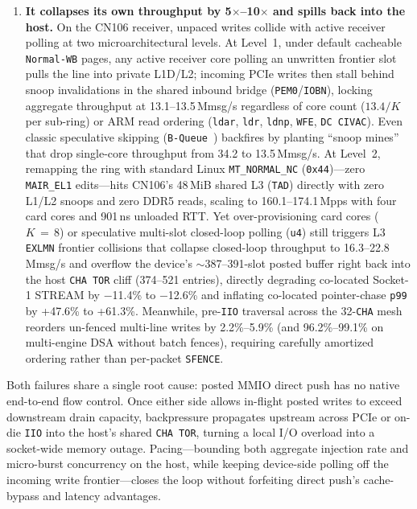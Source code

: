 \begin{enumerate}
  \item \textbf{It collapses its own throughput by 5$\times$--10$\times$ and spills back into the host.} On the CN106 receiver, unpaced writes collide with active receiver polling at two microarchitectural levels. At Level~1, under default cacheable \texttt{Normal-WB} pages, any active receiver core polling an unwritten frontier slot pulls the line into private L1D/L2; incoming PCIe writes then stall behind snoop invalidations in the shared inbound bridge (\texttt{PEM0}/\texttt{IOBN}), locking aggregate throughput at 13.1--13.5\,Mmsg/s regardless of core count ($13.4/K$ per sub-ring) or ARM read ordering (\texttt{ldar}, \texttt{ldr}, \texttt{ldnp}, \texttt{WFE}, \texttt{DC CIVAC}). Even classic speculative skipping (\texttt{B-Queue}~\cite{wang2013bqueue}) backfires by planting ``snoop mines'' that drop single-core throughput from 34.2 to 13.5\,Mmsg/s. At Level~2, remapping the ring with standard Linux \texttt{MT\_NORMAL\_NC} (\texttt{0x44})---zero \texttt{MAIR\_EL1} edits---hits CN106's 48\,MiB shared L3 (\texttt{TAD}) directly with zero L1/L2 snoops and zero DDR5 reads, scaling to 160.1--174.1\,Mpps with four card cores and 901\,ns unloaded RTT. Yet over-provisioning card cores ($K\,=\,8$) or speculative multi-slot closed-loop polling (\texttt{u4}) still triggers L3 \texttt{EXLMN} frontier collisions that collapse closed-loop throughput to 16.3--22.8\,Mmsg/s and overflow the device's $\sim$387--391-slot posted buffer right back into the host \texttt{CHA TOR} cliff (374--521 entries), directly degrading co-located Socket-1 STREAM by $-$11.4\% to $-$12.6\% and inflating co-located pointer-chase \texttt{p99} by +47.6\% to +61.3\%. Meanwhile, pre-\texttt{IIO} traversal across the 32-\texttt{CHA} mesh reorders un-fenced multi-line writes by 2.2\%--5.9\% (and 96.2\%--99.1\% on multi-engine DSA without batch fences), requiring carefully amortized ordering rather than per-packet \texttt{SFENCE}.
\end{enumerate}

Both failures share a single root cause: posted MMIO direct push has no native end-to-end flow control. Once either side allows in-flight posted writes to exceed downstream drain capacity, backpressure propagates upstream across PCIe or on-die \texttt{IIO} into the host's shared \texttt{CHA TOR}, turning a local I/O overload into a socket-wide memory outage. Pacing---bounding both aggregate injection rate and micro-burst concurrency on the host, while keeping device-side polling off the incoming write frontier---closes the loop without forfeiting direct push's cache-bypass and latency advantages.

